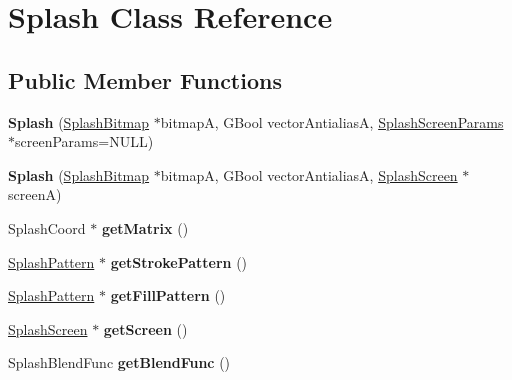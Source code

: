 \hypertarget{class_splash}{}\section{Splash Class Reference}
\label{class_splash}
\subsection*{Public Member Functions}
\begin{DoxyCompactItemize}
\item 
\mbox{\label{class_splash_a016d7f7cf7ccc86a8684095f2fee084e}} 
{\bfseries Splash} (\hyperlink{class_splash_bitmap}{Splash\+Bitmap} $\ast$bitmapA, G\+Bool vector\+AntialiasA, \hyperlink{struct_splash_screen_params}{Splash\+Screen\+Params} $\ast$screen\+Params=N\+U\+LL)
\item 
\mbox{\label{class_splash_a6a08ac060cf7e67551c35bf8ddec7f90}} 
{\bfseries Splash} (\hyperlink{class_splash_bitmap}{Splash\+Bitmap} $\ast$bitmapA, G\+Bool vector\+AntialiasA, \hyperlink{class_splash_screen}{Splash\+Screen} $\ast$screenA)
\item 
\mbox{\label{class_splash_a5edcacaa3be8a8bbd7df62d5ee29395b}} 
Splash\+Coord $\ast$ {\bfseries get\+Matrix} ()
\item 
\mbox{\label{class_splash_ace80e735dccaafe21f30cd01c08cbdbc}} 
\hyperlink{class_splash_pattern}{Splash\+Pattern} $\ast$ {\bfseries get\+Stroke\+Pattern} ()
\item 
\mbox{\label{class_splash_a2065172a4bacc02191244dc5827b2d42}} 
\hyperlink{class_splash_pattern}{Splash\+Pattern} $\ast$ {\bfseries get\+Fill\+Pattern} ()
\item 
\mbox{\label{class_splash_ac09824d25263602384f9ac0c68914eac}} 
\hyperlink{class_splash_screen}{Splash\+Screen} $\ast$ {\bfseries get\+Screen} ()
\item 
\mbox{\label{class_splash_a44ef29bccff9f2b5476872304b5727a6}} 
Splash\+Blend\+Func {\bfseries get\+Blend\+Func} ()
\item 
\mbox{\label{class_splash_adbd9347c0f2b325b2818b5bccd5937e0}} 

\end{DoxyCompactItemize}
